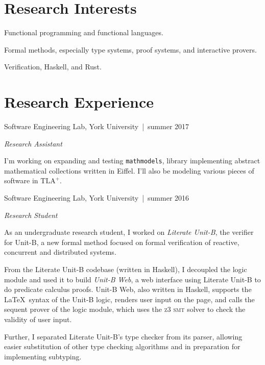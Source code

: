 \documentclass[12pt,letterpaper]{article}
\renewenvironment{itemize}{
  \begin{list}{}{
    \setlength{\leftmargin}{1.5em}
    \setlength{\itemsep}{0.25em}
    \setlength{\parskip}{0pt}
    \setlength{\parsep}{0.25em}
  }
}{
  \end{list}
}
\begin{document}
\section*{Research Interests}

\begin{itemize}
\item Functional programming and functional languages.
\item Formal methods, especially type systems, proof systems, and interactive
  provers.
\item Verification, Haskell, and Rust.
\end{itemize}

\section*{Research Experience}

\begin{itemize}
\item {\large Software Engineering Lab, } York University\, |\, {\small summer
  2017}

  \textit{Research Assistant}

  \begin{itemize}
  \item I'm working on expanding and testing \texttt{mathmodels},
    library implementing abstract mathematical collections written in Eiffel.
    I'll also be modeling various pieces of software in $\textrm{TLA}^+$.
  \end{itemize}

\item {\large Software Engineering Lab, } York University\, |\, {\small summer
    2016}

  \textit{Research Student}

  \begin{itemize}
  \item As an undergraduate research student, I worked on \textit{Literate
      Unit-B}, the verifier for Unit-B, a new formal method focused on formal
    verification of reactive, concurrent and distributed systems.

    From the Literate Unit-B codebase (written in Haskell), I decoupled the
    logic module and used it to build \textit{Unit-B Web}, a web interface using
    Literate Unit-B to do predicate calculus proofs. \linebreak Unit-B Web, also
    written in Haskell, supports the \LaTeX\ syntax of the Unit-B logic, renders
    user input on the page, and calls the sequent prover of the logic module,
    which uses the \textsc{z3 smt} solver to check the validity of user input.

  \item Further, I separated Literate Unit-B's type checker from its parser,
    allowing easier substitution of other type checking algorithms and in
    preparation for implementing subtyping.
  \end{itemize}
\end{itemize}
\end{document}
